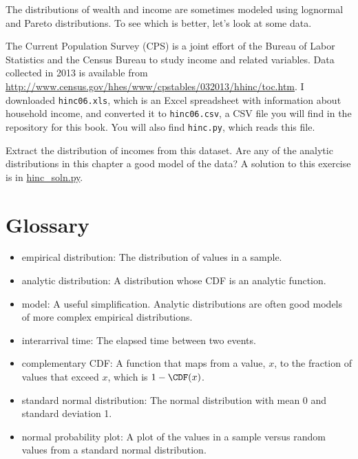 \documentclass[12pt]{book}
\begin{document}
\begin{exercise}
\label{income}

The distributions of wealth and income are sometimes modeled using
lognormal and Pareto distributions.  To see which is better, let's
look at some data.

The Current Population Survey (CPS) is a joint effort of the Bureau
of Labor Statistics and the Census Bureau to study income and related
variables.  Data collected in 2013 is available from
\url{http://www.census.gov/hhes/www/cpstables/032013/hhinc/toc.htm}.
I downloaded {\tt hinc06.xls}, which is an Excel spreadsheet with
information about household income, and converted it to {\tt hinc06.csv},
a CSV file you will find in the repository for this book.  You
will also find {\tt hinc.py}, which reads this file.

Extract the distribution of incomes from this dataset.  Are any of the
analytic distributions in this chapter a good model of the data?  A
solution to this exercise is in \url{hinc_soln.py}.

\end{exercise}




\section{Glossary}

\begin{itemize}

\item empirical distribution: The distribution of values in a sample.
   

\item analytic distribution: A distribution whose CDF is an analytic
function.

\item model: A useful simplification.  Analytic distributions are
often good models of more complex empirical distributions.

\item interarrival time: The elapsed time between two events.

\item complementary CDF: A function that maps from a value, $x$,
to the fraction of values that exceed $x$, which is $1 - \CDF(x)$.
  

\item standard normal distribution: The normal distribution with
mean 0 and standard deviation 1.

\item normal probability plot: A plot of the values in a sample versus
random values from a standard normal distribution.

\end{itemize}
\end{document}
